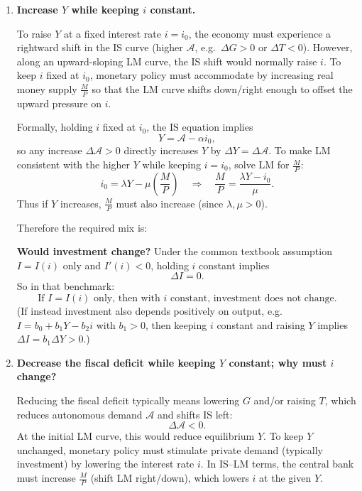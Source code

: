 \documentclass[12pt]{article}
\begin{document}
\begin{enumerate}[label=(\alph*)]
\item \textbf{Increase \(Y\) while keeping \(i\) constant.}

To raise \(Y\) at a fixed interest rate \(i=i_0\), the economy must experience a rightward shift in the IS curve (higher \(\mathcal{A}\), e.g.\ \(\Delta G>0\) or \(\Delta T<0\)). However, along an upward-sloping LM curve, the IS shift would normally raise \(i\). To keep \(i\) fixed at \(i_0\), monetary policy must accommodate by increasing real money supply \(\frac{M}{P}\) so that the LM curve shifts down/right enough to offset the upward pressure on \(i\).

Formally, holding \(i\) fixed at \(i_0\), the IS equation implies
\[
Y = \mathcal{A} - \alpha i_0,
\]
so any increase \(\Delta\mathcal{A}>0\) directly increases \(Y\) by \(\Delta Y = \Delta\mathcal{A}\). To make LM consistent with the higher \(Y\) while keeping \(i=i_0\), solve LM for \(\frac{M}{P}\):
\[
i_0 = \lambda Y - \mu\left(\frac{M}{P}\right)
\quad\Longrightarrow\quad
\frac{M}{P} = \frac{\lambda Y - i_0}{\mu}.
\]
Thus if \(Y\) increases, \(\frac{M}{P}\) must also increase (since \(\lambda,\mu>0\)).

Therefore the required mix is:

\begin{center}

\end{center}

\textbf{Would investment change?}
Under the common textbook assumption \(I=I(i)\) only and \(I'(i)<0\), holding \(i\) constant implies
\[
\Delta I = 0.
\]
So in that benchmark:
\[
\boxed{\,\text{If }I=I(i)\text{ only, then with }i\text{ constant, investment does not change.}\,}
\]
(If instead investment also depends positively on output, e.g.\ \(I=b_0+b_1Y-b_2i\) with \(b_1>0\), then keeping \(i\) constant and raising \(Y\) implies \(\Delta I=b_1\Delta Y>0\).)

\item \textbf{Decrease the fiscal deficit while keeping \(Y\) constant; why must \(i\) change?}

Reducing the fiscal deficit typically means lowering \(G\) and/or raising \(T\), which reduces autonomous demand \(\mathcal{A}\) and shifts IS left:
\[
\Delta \mathcal{A}<0.
\]
At the initial LM curve, this would reduce equilibrium \(Y\). To keep \(Y\) unchanged, monetary policy must stimulate private demand (typically investment) by lowering the interest rate \(i\). In IS--LM terms, the central bank must increase \(\frac{M}{P}\) (shift LM right/down), which lowers \(i\) at the given \(Y\).


\end{enumerate}
\end{document}
